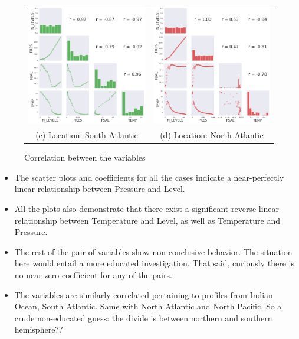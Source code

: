 \documentclass[12pt]{article}
\begin{document}
\begin{figure}[!ht]
\begin{tabular}{cc}
        \hspace{-30pt} \includegraphics[width=70mm]{correlation3.png} &\hspace{10pt}   \includegraphics[width=70mm]{correlation4.png} \\
        (c) Location: South Atlantic & (d) Location: North Atlantic \\[15pt]
        \end{tabular}
        \caption{Correlation between the variables}
        \label{corr}
    \end{figure}
    
\begin{itemize}
    \item The scatter plots and coefficients for all the cases 
    indicate a near-perfectly
    linear relationship between Pressure and Level. 
    \item All the plots also demonstrate that there exist a 
    significant reverse linear relationship between Temperature 
    and Level,
    as well as Temperature and Pressure.
    \item The rest of the pair of variables show non-conclusive 
    behavior. The situation here would entail a more educated 
    investigation. That said, curiously there is no near-zero 
    coefficient for any of the pairs.
    \item The variables are similarly correlated pertaining to 
    profiles from Indian Ocean, South Atlantic. Same with North Atlantic
    and North Pacific. So a crude non-educated guess: the divide 
    is between northern and southern hemisphere??
\end{itemize}
\end{document}

